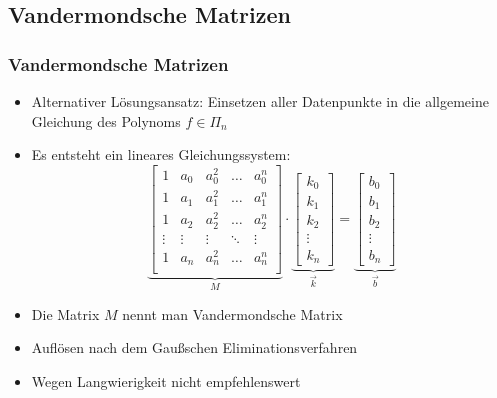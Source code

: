 \documentclass[table]{beamer}
\begin{document}
\subsection{Vandermondsche Matrizen}
	\begin{frame}
	\frametitle{Vandermondsche Matrizen}
		\begin{itemize}[<+->]
			\item Alternativer Lösungsansatz: Einsetzen aller Datenpunkte in die allgemeine Gleichung des Polynoms $f\in \Pi_n$
			\item Es entsteht ein lineares Gleichungssystem:
			\begin{equation}
			\nonumber
			\underbrace{
				\begin{bmatrix}
				1	&	a_0	&	a_0^2	&	\dots	&	a_0^n	\\
				1	&	a_1	&	a_1^2	&	\dots	&	a_1^n	\\
				1	&	a_2	&	a_2^2	&	\dots	&	a_2^n	\\
				\vdots &\vdots &\vdots	&	\ddots	&	\vdots	\\
				1	&	a_n	&	a_n^2	&	\dots	&	a_n^n	\\
				\end{bmatrix}}_M \cdot
			\underbrace{
				\begin{bmatrix}
				k_0 \\ k_1 \\ k_2 \\ \vdots \\ k_n
				\end{bmatrix}}_{\vec{k}} = 
			\underbrace{
				\begin{bmatrix}
				b_0 \\ b_1 \\ b_2 \\ \vdots \\ b_n
				\end{bmatrix}}_{\vec{b}}
			\end{equation}
			\item Die Matrix $M$ nennt man Vandermondsche Matrix
			\item Auflösen nach dem Gaußschen Eliminationsverfahren
			\item Wegen Langwierigkeit nicht empfehlenswert
		\end{itemize}
	\end{frame}
\end{document}
